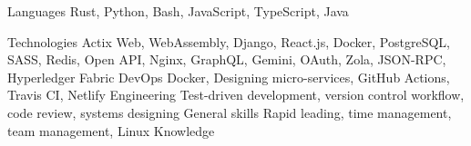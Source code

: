 
\begin{cvskills}
  \cvskill
    {Languages} %
    {Rust, Python, Bash, JavaScript, TypeScript, Java} %

  \cvskill
    {Technologies} %
    {Actix Web, WebAssembly, Django, React.js, Docker, PostgreSQL, SASS, Redis, Open API, Nginx, GraphQL, Gemini, OAuth, Zola, JSON-RPC, Hyperledger Fabric} %
  \cvskill
    {DevOps}
    {Docker, Designing micro-services, GitHub Actions, Travis CI, Netlify}
  \cvskill
    {Engineering}
    {Test-driven development, version control workflow, code review, systems designing}
  \cvskill
    {General skills}
    {Rapid leading, time management, team management, Linux Knowledge}
\end{cvskills}